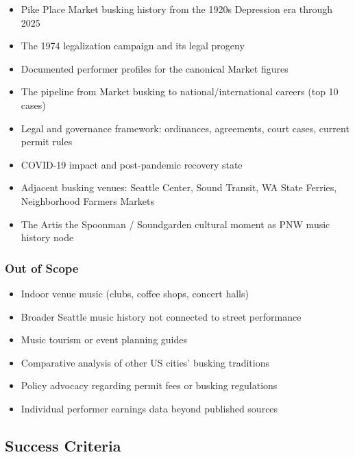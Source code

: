 \documentclass[11pt,letterpaper]{article}
\begin{document}
\begin{itemize}[leftmargin=1.5em]
  \item Pike Place Market busking history from the 1920s Depression era through 2025
  \item The 1974 legalization campaign and its legal progeny
  \item Documented performer profiles for the canonical Market figures
  \item The pipeline from Market busking to national/international careers (top 10 cases)
  \item Legal and governance framework: ordinances, agreements, court cases, current permit rules
  \item COVID-19 impact and post-pandemic recovery state
  \item Adjacent busking venues: Seattle Center, Sound Transit, WA State Ferries, Neighborhood Farmers Markets
  \item The Artis the Spoonman / Soundgarden cultural moment as PNW music history node
\end{itemize}

\subsubsection{Out of Scope}

\begin{itemize}[leftmargin=1.5em]
  \item Indoor venue music (clubs, coffee shops, concert halls)
  \item Broader Seattle music history not connected to street performance
  \item Music tourism or event planning guides
  \item Comparative analysis of other US cities' busking traditions
  \item Policy advocacy regarding permit fees or busking regulations
  \item Individual performer earnings data beyond published sources
\end{itemize}

\subsection{Success Criteria}
\end{document}
